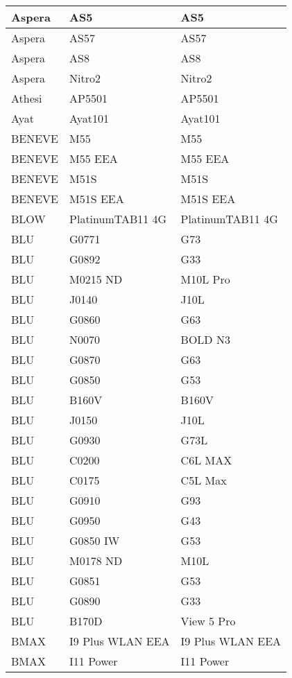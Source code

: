 \begin{tabularx}{\linewidth}{|l|X|X|}
        Aspera & AS5 & AS5 \\ \hline
        Aspera & AS57 & AS57 \\ \hline
        Aspera & AS8 & AS8 \\ \hline
        Aspera & Nitro2 & Nitro2 \\ \hline
        Athesi & AP5501 & AP5501 \\ \hline
        Ayat & Ayat101 & Ayat101 \\ \hline
        BENEVE & M55 & M55 \\ \hline
        BENEVE & M55 EEA & M55 EEA \\ \hline
        BENEVE & M51S & M51S \\ \hline
        BENEVE & M51S EEA & M51S EEA \\ \hline
        BLOW & PlatinumTAB11 4G & PlatinumTAB11 4G \\ \hline
        BLU & G0771 & G73 \\ \hline
        BLU & G0892 & G33 \\ \hline
        BLU & M0215 ND & M10L Pro \\ \hline
        BLU & J0140 & J10L \\ \hline
        BLU & G0860 & G63 \\ \hline
        BLU & N0070 & BOLD N3 \\ \hline
        BLU & G0870 & G63 \\ \hline
        BLU & G0850 & G53 \\ \hline
        BLU & B160V & B160V \\ \hline
        BLU & J0150 & J10L \\ \hline
        BLU & G0930 & G73L \\ \hline
        BLU & C0200 & C6L MAX \\ \hline
        BLU & C0175 & C5L Max \\ \hline
        BLU & G0910 & G93 \\ \hline
        BLU & G0950 & G43 \\ \hline
        BLU & G0850 IW & G53 \\ \hline
        BLU & M0178 ND & M10L \\ \hline
        BLU & G0851 & G53 \\ \hline
        BLU & G0890 & G33 \\ \hline
        BLU & B170D & View 5 Pro \\ \hline
        BMAX & I9 Plus WLAN EEA & I9 Plus WLAN EEA \\ \hline
        BMAX & I11 Power & I11 Power \\ \hline

\end{tabularx}
